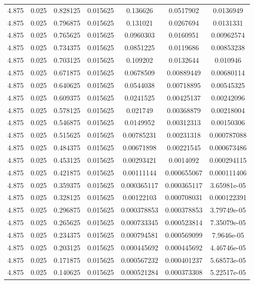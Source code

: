 \begin{flushleft}
\begin{longtable}{ccccccc}
4.875 & 0.025 & 0.828125 & 0.015625 & 0.136626 & 0.0517902 & 0.0136949  \\ 
4.875 & 0.025 & 0.796875 & 0.015625 & 0.131021 & 0.0267694 & 0.0131331  \\ 
4.875 & 0.025 & 0.765625 & 0.015625 & 0.0960303 & 0.0160951 & 0.00962574  \\ 
4.875 & 0.025 & 0.734375 & 0.015625 & 0.0851225 & 0.0119686 & 0.00853238  \\ 
4.875 & 0.025 & 0.703125 & 0.015625 & 0.109202 & 0.0132644 & 0.010946  \\ 
4.875 & 0.025 & 0.671875 & 0.015625 & 0.0678509 & 0.00889449 & 0.00680114  \\ 
4.875 & 0.025 & 0.640625 & 0.015625 & 0.0544038 & 0.00718895 & 0.00545325  \\ 
4.875 & 0.025 & 0.609375 & 0.015625 & 0.0241525 & 0.00425137 & 0.00242096  \\ 
4.875 & 0.025 & 0.578125 & 0.015625 & 0.021749 & 0.00368879 & 0.00218004  \\ 
4.875 & 0.025 & 0.546875 & 0.015625 & 0.0149952 & 0.00312313 & 0.00150306  \\ 
4.875 & 0.025 & 0.515625 & 0.015625 & 0.00785231 & 0.00231318 & 0.000787088  \\ 
4.875 & 0.025 & 0.484375 & 0.015625 & 0.00671898 & 0.00221545 & 0.000673486  \\ 
4.875 & 0.025 & 0.453125 & 0.015625 & 0.00293421 & 0.0014092 & 0.000294115  \\ 
4.875 & 0.025 & 0.421875 & 0.015625 & 0.00111144 & 0.000655067 & 0.000111406  \\ 
4.875 & 0.025 & 0.359375 & 0.015625 & 0.000365117 & 0.000365117 & 3.65981e-05  \\ 
4.875 & 0.025 & 0.328125 & 0.015625 & 0.00122103 & 0.000708031 & 0.000122391  \\ 
4.875 & 0.025 & 0.296875 & 0.015625 & 0.000378853 & 0.000378853 & 3.79749e-05  \\ 
4.875 & 0.025 & 0.265625 & 0.015625 & 0.000733345 & 0.000523814 & 7.35079e-05  \\ 
4.875 & 0.025 & 0.234375 & 0.015625 & 0.000794581 & 0.000569099 & 7.9646e-05  \\ 
4.875 & 0.025 & 0.203125 & 0.015625 & 0.000445692 & 0.000445692 & 4.46746e-05  \\ 
4.875 & 0.025 & 0.171875 & 0.015625 & 0.000567232 & 0.000401237 & 5.68573e-05  \\ 
4.875 & 0.025 & 0.140625 & 0.015625 & 0.000521284 & 0.000373308 & 5.22517e-05  \\ 

\end{longtable}
\end{flushleft}
